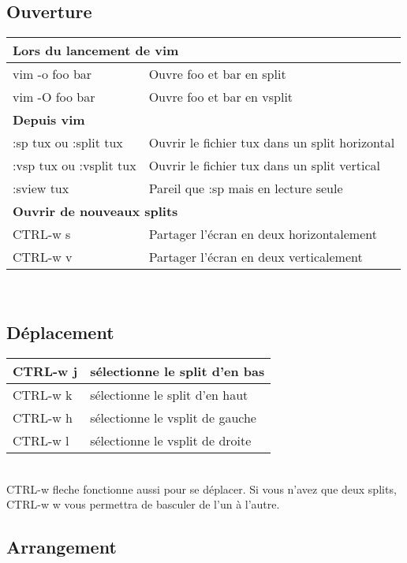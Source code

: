 \documentclass{article}
\begin{document}
\subsection{Ouverture}
\begin{tabular}{|p{3cm}| l| }\hline
\multicolumn{2}{|l|}{\textbf{Lors du lancement de vim }} \\ \hline
    vim -o foo bar & Ouvre foo et bar en split\\ \hline
    vim -O foo bar & Ouvre foo et bar en vsplit\\ \hline
\multicolumn{2}{|l|}{\textbf{Depuis vim}}\\ \hline
:sp tux ou :split tux & Ouvrir le fichier tux dans un split horizontal \\ \hline
    :vsp tux ou :vsplit tux & Ouvrir le fichier tux dans un split vertical \\ \hline
    :sview tux & Pareil que :sp mais en lecture seule \\ \hline
\multicolumn{2}{|l|}{\textbf{Ouvrir de nouveaux splits }} \\ \hline
CTRL-w s & Partager l'écran en deux horizontalement \\ \hline
    CTRL-w v & Partager l'écran en deux verticalement \\ \hline
\end{tabular}\\

\subsection{Déplacement}

\begin{tabular}{|p{3cm}| l| }\hline
CTRL-w j & sélectionne le split d'en bas\\ \hline
CTRL-w k & sélectionne le split d'en haut\\ \hline
CTRL-w h & sélectionne le vsplit de gauche\\ \hline
CTRL-w l & sélectionne le vsplit de droite\\ \hline
\end{tabular}\\

\noindent
 CTRL-w fleche fonctionne aussi pour se déplacer. Si vous n'avez que deux splits, CTRL-w w vous permettra de basculer de l'un à l'autre.
\subsection{Arrangement}
\end{document}
